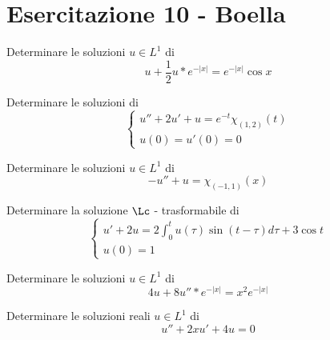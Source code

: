 \chapter{Esercitazione 10 - Boella}

\ParteEsercizi

\Esercizio{}

Determinare le soluzioni $u\in L^{1}$ di
\begin{equation*}
u + \frac{1}{2} u*e^{- | x|} = e^{- | x|}\cos x
\end{equation*}

\Esercizio{}

Determinare le soluzioni di
\begin{equation*}
\begin{cases}
u'' + 2u' + u = e^{- t} \chi_{(1, 2)}(t)\\
u(0) = u'(0) = 0
\end{cases}
\end{equation*}

\Esercizio{}

Determinare le soluzioni $u\in L^{1}$ di
\begin{equation*}
- u'' + u = \chi_{(- 1, 1)}(x)
\end{equation*}

\Esercizio{}

Determinare la soluzione $\Lc$ - trasformabile di
\begin{equation*}
\begin{cases}
u' + 2u = 2\int^{t}_{0} u(\tau)\sin(t - \tau) d\tau + 3\cos t\\
u(0) = 1
\end{cases}
\end{equation*}

\Esercizio{}

Determinare le soluzioni $u\in L^{1}$ di
\begin{equation*}
4u + 8u''*e^{- | x|} = x^{2} e^{- | x|}
\end{equation*}

\Esercizio{}

Determinare le soluzioni reali $u\in L^{1}$ di
\begin{equation*}
u'' + 2xu' + 4u = 0
\end{equation*}

\ParteSoluzioni

\Soluzione

